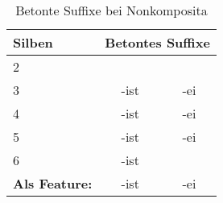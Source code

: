 \begin{table}[h]
\centering
\caption{Betonte Suffixe bei Nonkomposita}
\begin{tabular}{|l|cc|}
\hline
{\bf Silben}       & \multicolumn{2}{c|}{{\bf Betontes Suffixe}} \\ \hline
2                  &                      &                     \\
3                  & -ist                 & -ei                 \\
4                  & -ist                 & -ei                 \\
5                  & -ist                 & -ei                 \\
6                  & -ist                 &                     \\ \hline
{\bf Als Feature:} & -ist                 & -ei                 \\ \hline
\end{tabular}
\end{table}